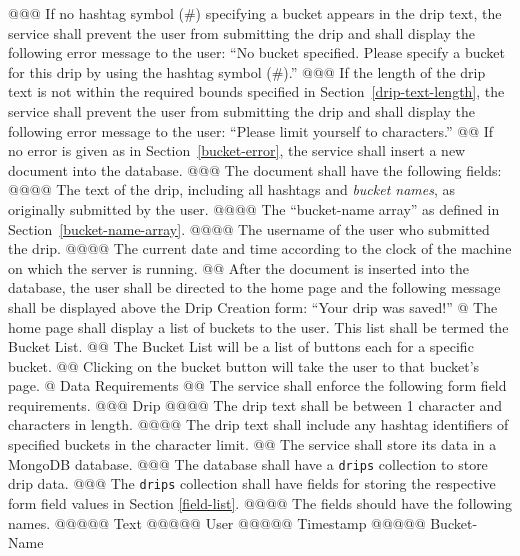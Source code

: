 \documentclass{article}
\begin{document}
\begin{easylist}[articletoc]
@@@ If no hashtag symbol (\#) specifying a bucket appears in the drip text, the service shall prevent the user from submitting the drip and shall display the following error message to the user: ``No bucket specified. Please specify a bucket for this drip by using the hashtag symbol (\#).''
@@@ If the length of the drip text is not within the required bounds specified in Section~\ref{drip-text-length}, the service shall prevent the user from submitting the drip and shall display the following error message to the user: ``Please limit yourself to \dripMaxLength{} characters.''
@@ If no error is given as in Section~\ref{bucket-error}, the service shall insert a new document into the database.
@@@ \label{field-list}The document shall have the following fields:
@@@@ The text of the drip, including all hashtags and \textit{bucket names}, as originally submitted by the user.
@@@@ The ``bucket-name array'' as defined in Section~\ref{bucket-name-array}.
@@@@ The username of the user who submitted the drip.
@@@@ The current date and time according to the clock of the machine on which the server is running.
@@ After the document is inserted into the database, the user shall be directed to the home page and the following message shall be displayed above the Drip Creation form: ``Your drip was saved!''
@ The home page shall display a list of buckets to the user. This list shall be termed the Bucket List.
@@ The Bucket List will be a list of buttons each for a specific bucket.
@@ Clicking on the bucket button will take the user to that bucket’s page.
@ Data Requirements
@@ The service shall enforce the following form field requirements.
@@@ Drip
@@@@ \label{drip-text-length}The drip text shall be between 1 character and \dripMaxLength{} characters in length.
@@@@ The drip text shall include any hashtag identifiers of specified buckets in the \dripMaxLength{} character limit.
@@ The service shall store its data in a MongoDB database.
@@@ The database shall have a \texttt{drips} collection to store drip data.
@@@ The \texttt{drips} collection shall have fields for storing the respective form field values in Section \ref{field-list}.
@@@@ The fields should have the following names.
@@@@@ Text
@@@@@ User
@@@@@ Timestamp
@@@@@ Bucket-Name

\end{easylist}
\end{document}
